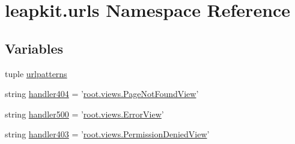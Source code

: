 \hypertarget{namespaceleapkit_1_1urls}{\section{leapkit.\-urls Namespace Reference}
\label{namespaceleapkit_1_1urls}
}
\subsection*{Variables}
\begin{DoxyCompactItemize}
\item 
tuple \hyperlink{namespaceleapkit_1_1urls_afa976c449da35d2fa63362f64ca3572c}{urlpatterns}
\item 
string \hyperlink{namespaceleapkit_1_1urls_af1a0eb986cb54155d4520d380ae758f6}{handler404} = '\hyperlink{classroot_1_1views_1_1_page_not_found_view}{root.\-views.\-Page\-Not\-Found\-View}'
\item 
string \hyperlink{namespaceleapkit_1_1urls_a0dc67d39fc6d863ad9cb47a4b2e96cff}{handler500} = '\hyperlink{classroot_1_1views_1_1_error_view}{root.\-views.\-Error\-View}'
\item 
string \hyperlink{namespaceleapkit_1_1urls_a60e372c870f8ab648b60e9619948706b}{handler403} = '\hyperlink{classroot_1_1views_1_1_permission_denied_view}{root.\-views.\-Permission\-Denied\-View}'
\end{DoxyCompactItemize}


